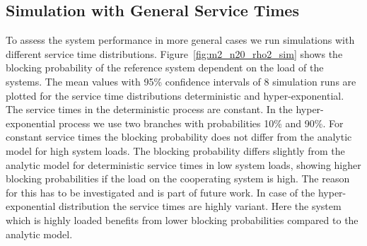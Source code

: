 \subsection{Simulation with General Service Times}\label{sec:simgeneral}

To assess the system performance in more general cases we run simulations with different service time distributions.
Figure~\ref{fig:m2_n20_rho2_sim} shows the blocking probability of the reference system dependent on the load of the systems. The mean values with 95\% confidence intervals of 8 simulation runs are plotted for the service time distributions deterministic and hyper-exponential.
The service times in the deterministic process are constant.
In the hyper-exponential process we use two branches with probabilities 10\% and 90\%.
For constant service times the blocking probability does not differ from the analytic model for high system loads. The blocking probability differs slightly from the analytic model for deterministic service times in low system loads, showing higher blocking probabilities if the load on the cooperating system is high. The reason for this has to be investigated and is part of future work. In case of the hyper-exponential distribution the service times are highly variant. Here the system which is highly loaded benefits from lower blocking probabilities compared to the analytic model.


